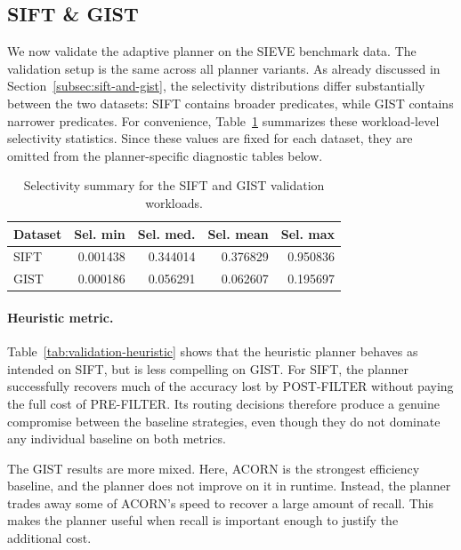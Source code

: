 \subsection{SIFT \& GIST}
\label{subsec:sift-and-gist-validation}

We now validate the adaptive planner on the SIEVE benchmark data. 
The validation setup is the same across all planner variants. As already discussed in Section~\ref{subsec:sift-and-gist}, the selectivity distributions differ substantially between the two datasets: SIFT contains broader predicates, while GIST contains narrower predicates. 
For convenience, Table~\ref{tab:sieve-selectivity-summary} summarizes these workload-level selectivity statistics. 
Since these values are fixed for each dataset, they are omitted from the planner-specific diagnostic tables below.

\begin{table}[H]
    \centering
    \renewcommand{\arraystretch}{1.12}
    \begin{tabular}{lrrrr}
        \toprule
        Dataset & Sel. min & Sel. med. & Sel. mean & Sel. max \\
        \midrule
        SIFT & 0.001438 & 0.344014 & 0.376829 & 0.950836 \\
        GIST & 0.000186 & 0.056291 & 0.062607 & 0.195697 \\
        \bottomrule
    \end{tabular}
    \caption{Selectivity summary for the SIFT and GIST validation workloads.}
    \label{tab:sieve-selectivity-summary}
\end{table}

\paragraph{Heuristic metric.}

Table~\ref{tab:validation-heuristic} shows that the heuristic planner behaves as intended on SIFT, but is less compelling on GIST.
For SIFT, the planner successfully recovers much of the accuracy lost by POST-FILTER without paying the full cost of PRE-FILTER.
Its routing decisions therefore produce a genuine compromise between the baseline strategies, even though they do not dominate any individual baseline on both metrics.

The GIST results are more mixed.
Here, ACORN is the strongest efficiency baseline, and the planner does not improve on it in runtime.
Instead, the planner trades away some of ACORN's speed to recover a large amount of recall.
This makes the planner useful when recall is important enough to justify the additional cost.

